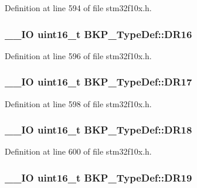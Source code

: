 Definition at line 594 of file stm32f10x.\-h.

\hypertarget{struct_b_k_p___type_def_a2824f0970d27bb9edf16075ac54fae23}{
\subsubsection[{D\-R16}]{\setlength{\rightskip}{0pt plus 5cm}\-\_\-\-\_\-\-I\-O {\bf uint16\-\_\-t} B\-K\-P\-\_\-\-Type\-Def\-::\-D\-R16}}\label{struct_b_k_p___type_def_a2824f0970d27bb9edf16075ac54fae23}


Definition at line 596 of file stm32f10x.\-h.

\hypertarget{struct_b_k_p___type_def_a78b37ff2fb91c016b8436f1218b10a4f}{
\subsubsection[{D\-R17}]{\setlength{\rightskip}{0pt plus 5cm}\-\_\-\-\_\-\-I\-O {\bf uint16\-\_\-t} B\-K\-P\-\_\-\-Type\-Def\-::\-D\-R17}}\label{struct_b_k_p___type_def_a78b37ff2fb91c016b8436f1218b10a4f}


Definition at line 598 of file stm32f10x.\-h.

\hypertarget{struct_b_k_p___type_def_a9a1b09d229ccb45e67108fdfee779d1d}{
\subsubsection[{D\-R18}]{\setlength{\rightskip}{0pt plus 5cm}\-\_\-\-\_\-\-I\-O {\bf uint16\-\_\-t} B\-K\-P\-\_\-\-Type\-Def\-::\-D\-R18}}\label{struct_b_k_p___type_def_a9a1b09d229ccb45e67108fdfee779d1d}


Definition at line 600 of file stm32f10x.\-h.

\hypertarget{struct_b_k_p___type_def_a7bddb28e7571f4c91ad1990123a61d7e}{
\subsubsection[{D\-R19}]{\setlength{\rightskip}{0pt plus 5cm}\-\_\-\-\_\-\-I\-O {\bf uint16\-\_\-t} B\-K\-P\-\_\-\-Type\-Def\-::\-D\-R19}}\label{struct_b_k_p___type_def_a7bddb28e7571f4c91ad1990123a61d7e}


